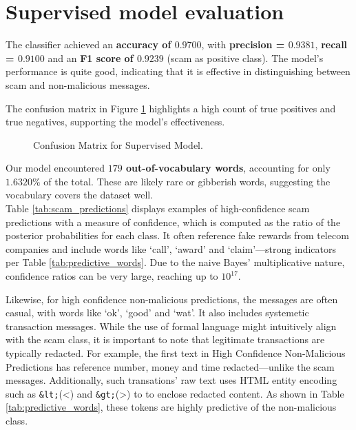 \documentclass[a4paper,12pt]{article}
\begin{document}
\section{Supervised model evaluation}
\label{sec:supervised-model-training}

The classifier achieved an \textbf{accuracy of $0.9700$}, with \textbf{precision = $0.9381$}, \textbf{recall = $0.9100$} and an \textbf{F1 score of $0.9239$} (scam as positive class). The model's performance is quite good, indicating that it is effective in distinguishing between scam and non-malicious messages.

The confusion matrix in Figure \ref{fig:base} highlights a high count of true positives and true negatives, supporting the model's effectiveness.

\begin{figure}[H]
    \centering
    
    \caption{Confusion Matrix for Supervised Model.}
    \label{fig:base}
\end{figure}

Our model encountered \textbf{$179$ out-of-vocabulary words}, accounting for only $1.6320\%$ of the total. These are likely rare or gibberish words, suggesting the vocabulary covers the dataset well. \\

Table \ref{tab:scam_predictions} displays examples of high-confidence scam predictions with a measure of confidence, which is computed as the ratio of the posterior probabilities for each class. It often reference fake rewards from telecom companies and include words like `call', `award' and `claim'—strong indicators per Table \ref{tab:predictive_words}. Due to the naive Bayes' multiplicative nature, confidence ratios can be very large, reaching up to $10^{17}$.

Likewise, for high confidence non-malicious predictions, the messages are often casual, with words like `ok', `good' and `wat'. It also includes systemetic transaction messages. While the use of formal language might intuitively align with the scam class, it is important to note that legitimate transactions are typically redacted. For example, the first text in High Confidence Non-Malicious Predictions has reference number, money and time redacted—unlike the scam messages. Additionally, such transations' raw text uses HTML entity encoding such as \texttt{\&lt;}(\textless) and \texttt{\&gt;}(\textgreater) to to enclose redacted content. As shown in Table \ref{tab:predictive_words}, these tokens are highly predictive of the non-malicious class.
\end{document}
